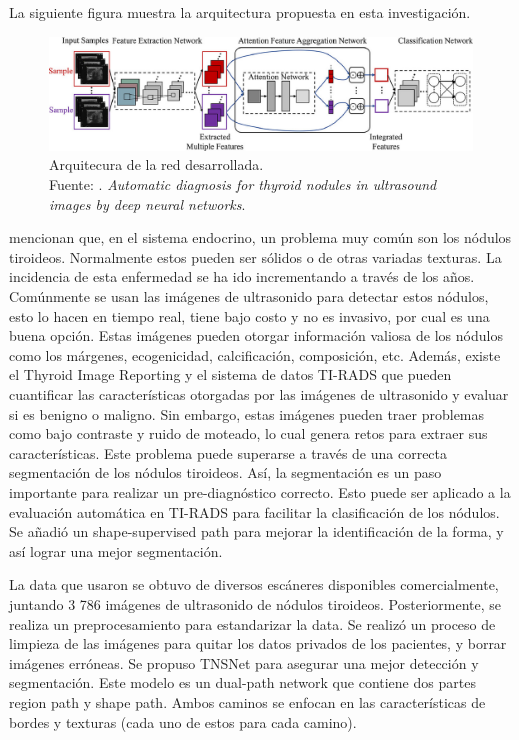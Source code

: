 La siguiente figura muestra la arquitectura propuesta en esta investigación.

\begin{figure}[H]
	\begin{center}
		\includegraphics[width=1.00\textwidth]{2/figures/antecedente_8.jpg}
		\caption[Arquitecura de la red desarrollada]{Arquitecura de la red desarrollada. \\
		Fuente: \cite{pr_sun2023classthynvit}. \textit{Automatic diagnosis for thyroid nodules in ultrasound images by deep neural networks}.}
		\label{2:fig103}
	\end{center}
\end{figure}


\cite{pr_sun2022tnsnet} mencionan que, en el sistema endocrino, un problema muy común son los nódulos tiroideos. Normalmente estos pueden ser sólidos o de otras variadas texturas. La incidencia de esta enfermedad se ha ido incrementando a través de los años. Comúnmente se usan las imágenes de ultrasonido para detectar estos nódulos, esto lo hacen en tiempo real, tiene bajo costo y no es invasivo, por cual es una buena opción. Estas imágenes pueden otorgar información valiosa de los nódulos como los márgenes, ecogenicidad, calcificación, composición, etc. Además, existe el Thyroid Image Reporting y el sistema de datos TI-RADS que pueden cuantificar las características otorgadas por las imágenes de ultrasonido y evaluar si es benigno o maligno. Sin embargo, estas imágenes pueden traer problemas como bajo contraste y ruido de moteado, lo cual genera retos para extraer sus características. Este problema puede superarse a través de una correcta segmentación de los nódulos tiroideos. Así, la segmentación es un paso importante para realizar un pre-diagnóstico correcto. Esto puede ser aplicado a la evaluación automática en TI-RADS para facilitar la clasificación de los nódulos. Se añadió un shape-supervised path para mejorar la identificación de la forma, y así lograr una mejor segmentación.

La data que usaron se obtuvo de diversos escáneres disponibles comercialmente, juntando 3 786 imágenes de ultrasonido de nódulos tiroideos. Posteriormente, se realiza un preprocesamiento para estandarizar la data. Se realizó un proceso de limpieza de las imágenes para quitar los datos privados de los pacientes, y borrar imágenes erróneas. Se propuso TNSNet para asegurar una mejor detección y segmentación. Este modelo es un dual-path network que contiene dos partes region path y shape path. Ambos caminos se enfocan en las características de bordes y texturas (cada uno de estos para cada camino).

